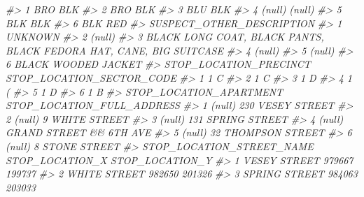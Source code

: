 \documentclass[
]{krantz}
\makeatletter
\newenvironment{Shaded}{\begin{snugshade}}{\end{snugshade}}
\newcommand{\CommentTok}[1]{\textcolor[rgb]{0.37,0.37,0.37}{\textit{#1}}}
\newenvironment{kframe}{%
\medskip{}
\setlength{\fboxsep}{.8em}
 \def\at@end@of@kframe{}%
 \ifinner\ifhmode%
  \def\at@end@of@kframe{\end{minipage}}%
  \begin{minipage}{\columnwidth}%
 \fi\fi%
 \def\FrameCommand##1{\hskip\@totalleftmargin \hskip-\fboxsep
 \colorbox{shadecolor}{##1}\hskip-\fboxsep
     \hskip-\linewidth \hskip-\@totalleftmargin \hskip\columnwidth}%
 \MakeFramed {\advance\hsize-\width
   \@totalleftmargin\z@ \linewidth\hsize
   \@setminipage}}%
 {\par\unskip\endMakeFramed%
 \at@end@of@kframe}
\renewenvironment{Shaded}{\begin{kframe}}{\end{kframe}}
\makeatother
\begin{document}
\begin{Shaded}
\begin{Highlighting}[]
\CommentTok{\#\textgreater{} 1               BRO                BLK}
\CommentTok{\#\textgreater{} 2               BRO                BLK}
\CommentTok{\#\textgreater{} 3               BLU                BLK}
\CommentTok{\#\textgreater{} 4            (null)             (null)}
\CommentTok{\#\textgreater{} 5               BLK                BLK}
\CommentTok{\#\textgreater{} 6               BLK                RED}
\CommentTok{\#\textgreater{}                                            SUSPECT\_OTHER\_DESCRIPTION}
\CommentTok{\#\textgreater{} 1                                                            UNKNOWN}
\CommentTok{\#\textgreater{} 2                                                             (null)}
\CommentTok{\#\textgreater{} 3 BLACK LONG COAT, BLACK PANTS, BLACK FEDORA HAT, CANE, BIG SUITCASE}
\CommentTok{\#\textgreater{} 4                                                             (null)}
\CommentTok{\#\textgreater{} 5                                                             (null)}
\CommentTok{\#\textgreater{} 6                                                BLACK WOODED JACKET}
\CommentTok{\#\textgreater{}   STOP\_LOCATION\_PRECINCT STOP\_LOCATION\_SECTOR\_CODE}
\CommentTok{\#\textgreater{} 1                      1                         C}
\CommentTok{\#\textgreater{} 2                      1                         C}
\CommentTok{\#\textgreater{} 3                      1                         D}
\CommentTok{\#\textgreater{} 4                      1                         (}
\CommentTok{\#\textgreater{} 5                      1                         D}
\CommentTok{\#\textgreater{} 6                      1                         B}
\CommentTok{\#\textgreater{}   STOP\_LOCATION\_APARTMENT STOP\_LOCATION\_FULL\_ADDRESS}
\CommentTok{\#\textgreater{} 1                  (null)           230 VESEY STREET}
\CommentTok{\#\textgreater{} 2                  (null)             9 WHITE STREET}
\CommentTok{\#\textgreater{} 3                  (null)          131 SPRING STREET}
\CommentTok{\#\textgreater{} 4                  (null)    GRAND STREET \&\& 6TH AVE}
\CommentTok{\#\textgreater{} 5                  (null)         32 THOMPSON STREET}
\CommentTok{\#\textgreater{} 6                  (null)             8 STONE STREET}
\CommentTok{\#\textgreater{}   STOP\_LOCATION\_STREET\_NAME STOP\_LOCATION\_X STOP\_LOCATION\_Y}
\CommentTok{\#\textgreater{} 1              VESEY STREET          979667          199737}
\CommentTok{\#\textgreater{} 2              WHITE STREET          982650          201326}
\CommentTok{\#\textgreater{} 3             SPRING STREET          984063          203033}

\end{Highlighting}
\end{Shaded}
\end{document}
